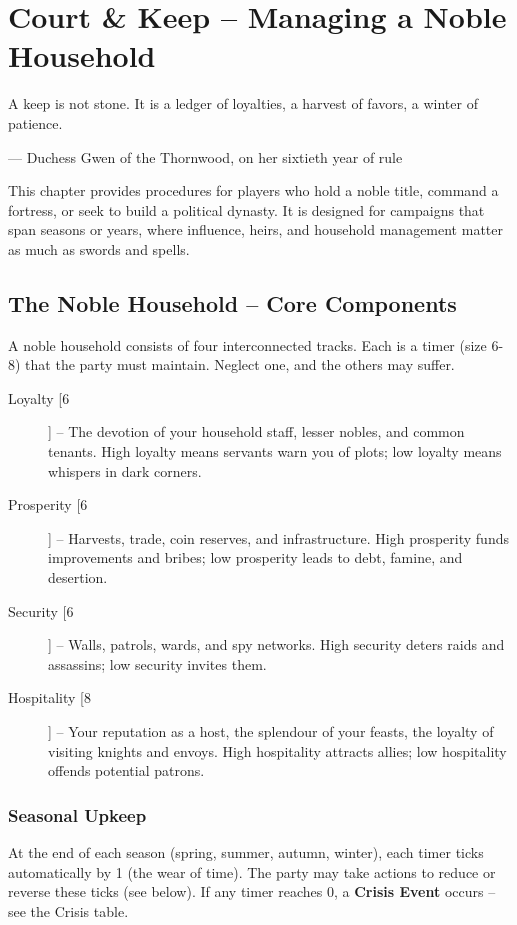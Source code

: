 \documentclass[11pt]{article}
\begin{document}
\chapter{Court \& Keep -- Managing a Noble Household}
\label{ch:courtkeep}

\epigraph{A keep is not stone. It is a ledger of loyalties, a harvest of favors, a winter of patience.}{--- Duchess Gwen of the Thornwood, on her sixtieth year of rule}

This chapter provides procedures for players who hold a noble title, command a fortress, or seek to build a political dynasty. It is designed for campaigns that span seasons or years, where influence, heirs, and household management matter as much as swords and spells.

\section{The Noble Household -- Core Components}

A noble household consists of four interconnected tracks. Each is a timer (size 6-8) that the party must maintain. Neglect one, and the others may suffer.

\begin{description}
    \item[Loyalty [6]] -- The devotion of your household staff, lesser nobles, and common tenants. High loyalty means servants warn you of plots; low loyalty means whispers in dark corners.
    \item[Prosperity [6]] -- Harvests, trade, coin reserves, and infrastructure. High prosperity funds improvements and bribes; low prosperity leads to debt, famine, and desertion.
    \item[Security [6]] -- Walls, patrols, wards, and spy networks. High security deters raids and assassins; low security invites them.
    \item[Hospitality [8]] -- Your reputation as a host, the splendour of your feasts, the loyalty of visiting knights and envoys. High hospitality attracts allies; low hospitality offends potential patrons.
\end{description}

\subsection*{Seasonal Upkeep}
At the end of each season (spring, summer, autumn, winter), each timer ticks automatically by 1 (the wear of time). The party may take actions to reduce or reverse these ticks (see below). If any timer reaches 0, a \textbf{Crisis Event} occurs -- see the Crisis table.
\end{document}
